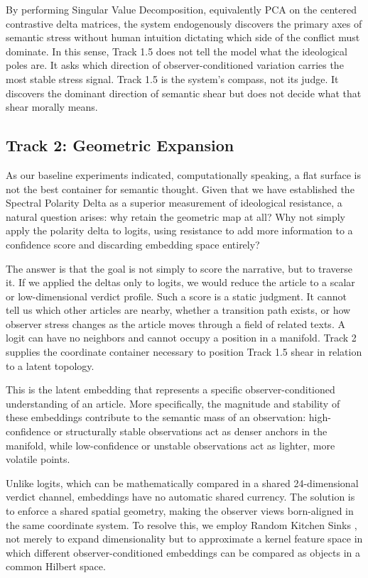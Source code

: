 By performing Singular Value Decomposition, equivalently PCA on the centered contrastive delta matrices, the system endogenously discovers the primary axes of semantic stress without human intuition dictating which side of the conflict must dominate. In this sense, Track 1.5 does not tell the model what the ideological poles are. It asks which direction of observer-conditioned variation carries the most stable stress signal. Track 1.5 is the system's compass, not its judge. It discovers the dominant direction of semantic shear but does not decide what that shear morally means.

\subsection{Track 2: Geometric Expansion}

As our baseline experiments indicated, computationally speaking, a flat surface is not the best container for semantic thought. Given that we have established the Spectral Polarity Delta as a superior measurement of ideological resistance, a natural question arises: why retain the geometric map at all? Why not simply apply the polarity delta to logits, using resistance to add more information to a confidence score and discarding embedding space entirely?

The answer is that the goal is not simply to score the narrative, but to traverse it. If we applied the deltas only to logits, we would reduce the article to a scalar or low-dimensional verdict profile. Such a score is a static judgment. It cannot tell us which other articles are nearby, whether a transition path exists, or how observer stress changes as the article moves through a field of related texts. A logit can have no neighbors and cannot occupy a position in a manifold. Track 2 supplies the coordinate container necessary to position Track 1.5 shear in relation to a latent topology.

This is the latent embedding that represents a specific observer-conditioned understanding of an article. More specifically, the magnitude and stability of these embeddings contribute to the semantic mass of an observation: high-confidence or structurally stable observations act as denser anchors in the manifold, while low-confidence or unstable observations act as lighter, more volatile points.

Unlike logits, which can be mathematically compared in a shared 24-dimensional verdict channel, embeddings have no automatic shared currency. The solution is to enforce a shared spatial geometry, making the observer views born-aligned in the same coordinate system. To resolve this, we employ Random Kitchen Sinks \citep{rahimi2008}, not merely to expand dimensionality but to approximate a kernel feature space in which different observer-conditioned embeddings can be compared as objects in a common Hilbert space.

